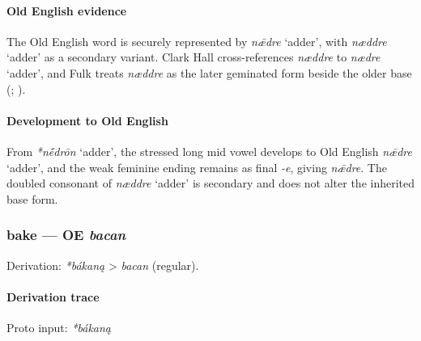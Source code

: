 \documentclass[
  british,
  a4paper,
]{article}
\providecommand{\Recon}[1]{\emph{*#1}}
\begin{document}
\paragraph{Old English evidence}\label{old-english-evidence}

The Old English word is securely represented by {\emph{nǣdre}} `adder',
with {\emph{næddre}} `adder' as a secondary variant. Clark Hall
cross-references {\emph{næddre}} to {\emph{nædre}} `adder', and Fulk
treats {\emph{næddre}} as the later geminated form beside the older base
(;
).

\paragraph{Development to Old English}\label{development-to-old-english}

From \Recon{nḗdrōn} `adder', the stressed long mid vowel develops to Old
English {\emph{nǣdre}} `adder', and the weak feminine ending remains as
final \emph{-e}, giving {\emph{nǣdre}}. The doubled consonant of
{\emph{næddre}} `adder' is secondary and does not alter the inherited
base form.

\subsubsection{\texorpdfstring{bake --- OE
\emph{bacan}}{bake --- OE bacan}}\label{bake-oe-bacan}

Derivation: \emph{*bákaną} \textgreater{} \emph{bacan} (regular).

\paragraph{Derivation trace}\label{derivation-trace-1}

Proto input: \emph{*bákaną}

\begingroup
\setlength{\fboxsep}{6pt}
\end{document}
